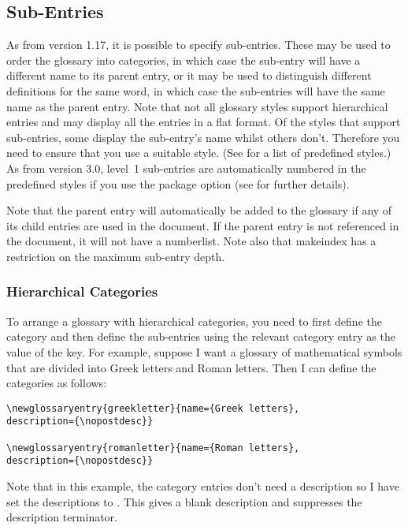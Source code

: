 \documentclass{nlctdoc}
\newcommand*{\gloskey}[2][newglossaryentry]{\csopt{#1}{#2}}
\begin{document}
\subsection{Sub-Entries}
\label{sec:subentries}

As from version 1.17, it is possible to specify sub-entries. These
may be used to order the glossary into categories, in which case the
sub-entry will have a different name to its parent entry, or it may
be used to distinguish different definitions for the same word, in
which case the sub-entries will have the same name as the parent
entry. Note that not all glossary styles support hierarchical
entries and may display all the entries in a flat format. Of the
styles that support sub-entries, some display the sub-entry's name
whilst others don't. Therefore you need to ensure that you use a
suitable style. (See  for a list of predefined
styles.) As from version 3.0, level~1 sub-entries are automatically
numbered in the predefined styles if you use the
 package option (see
 for further details).

Note that the parent entry will automatically be added to the
glossary if any of its child entries are used in the document.
If the parent entry is not referenced in the document, it will not
have a \gls{numberlist}. Note also that \gls{makeindex} has a
restriction on the maximum sub-entry depth.

\subsubsection{Hierarchical Categories}

To arrange a glossary with hierarchical categories, you need to
first define the category and then define the sub-entries using the
relevant category entry as the value of the \gloskey{parent} key.
For example, suppose I want a glossary of mathematical symbols that
are divided into Greek letters and Roman letters. Then I can define
the categories as follows:
\begin{verbatim}
\newglossaryentry{greekletter}{name={Greek letters},
description={\nopostdesc}}

\newglossaryentry{romanletter}{name={Roman letters},
description={\nopostdesc}}
\end{verbatim}

Note that in this example, the category entries don't need a
description so I have set the descriptions to .
This gives a blank description and suppresses the
description terminator.
\end{document}
